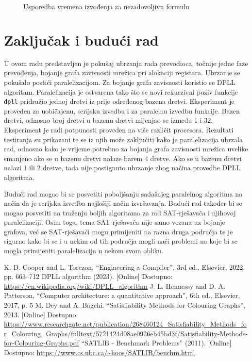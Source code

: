 \documentclass[conference]{IEEEtran}
\begin{document}
\begin{figure}[ht]
\centerline{}
\caption{Usporedba vremena izvođenja za nezadovoljivu formulu}
\label{fig5}
\end{figure}

\section{Zaključak i budući rad}

U ovom radu predstavljen je pokušaj ubrzanja rada prevodioca, točnije jedne faze prevođenja, bojanje grafa zavisnosti mrežica pri alokaciji registara. Ubrzanje se pokušalo postići paralelizacijom. Za bojanje grafa zavisnosti koristio se DPLL algoritam. Paralelizacija je ostvarena tako što se novi rekurzivni poziv funkcije \texttt{dpll} pridružio jednoj dretvi iz prije određenog bazena dretvi. Eksperiment je proveden za uobičajenu, serijsku izvedbu i za paralelnu izvedbu funkcije. Bazen dretvi, odnosno broj dretvi u bazenu dretvi mijenjao se između 1 i 32. Eksperiment je radi potpunosti proveden na više različit procesora. Rezultati testiranja su prikazani te se iz njih može zaključiti kako je paralelizacija ubrzala rad, odnosno kako je vrijeme potrebno za bojanja grafa zavisnosti mrežica uvelike smanjeno ako se u bazenu dretvi nalaze barem 4 dretve. Ako se u bazenu dretvi nalazi 1 ili 2 dretve, tada nije postignuto ubrzanje zbog načina provedbe DPLL algoritma.

Budući rad mogao bi se posvetiti poboljšanju sadašnjeg paralelnog algoritma na način da je serijska izvedba najlošiji način izvršavanja. Budući rad također bi se mogao posvetiti na traženju boljih algoritama za rad SAT-rješavača i njihovoj paralelizaciji. Osim toga, tema SAT-rješavača nije samo vezana uz bojanje grafova, već se SAT-rješavači mogu primijeniti na razna druga područja te je sigurno kako bi se i u nekim od tih područja mogli naći problemi na koje bi se mogla primijeniti paralelizacija u nekom svom obliku.

\begin{thebibliography}{00}
 K. D. Cooper and L. Torczon, ``Engineering a Compiler'', 3rd ed., Elsevier, 2022, pp. 663--712
 DPLL algorithm (2023). [Online] Dostupno: \url{https://en.wikipedia.org/wiki/DPLL_algorithm}
 J. L. Hennessy and D. A. Patterson, ``Computer architecture: a quantitative approach'', 6th ed., Elsevier, 2017, p. 5
 M. Dey and A. Bagchi. ``Satisfiability Methods for Colouring Graphs'', 2013. [Online] Dostupno:
\url{https://www.researchgate.net/publication/268460124_Satisfiability_Methods_for_Colouring_Graphs/fulltext/5721424d08ae0926eb45bd3f/Satisfiability-Methods-for-Colouring-Graphs.pdf}
 ``SATLIB - Benchmark Problems'' (2011). [Online] Dostupno:
\url{https://www.cs.ubc.ca/~hoos/SATLIB/benchm.html}
\end{thebibliography}
\vspace{12pt}
\end{document}
